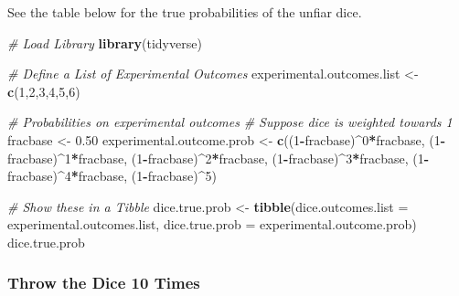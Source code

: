 \documentclass[
]{book}
\newenvironment{Shaded}{\begin{snugshade}}{\end{snugshade}}
\newcommand{\CommentTok}[1]{\textcolor[rgb]{0.56,0.35,0.01}{\textit{#1}}}
\newcommand{\DataTypeTok}[1]{\textcolor[rgb]{0.13,0.29,0.53}{#1}}
\newcommand{\DecValTok}[1]{\textcolor[rgb]{0.00,0.00,0.81}{#1}}
\newcommand{\FloatTok}[1]{\textcolor[rgb]{0.00,0.00,0.81}{#1}}
\newcommand{\KeywordTok}[1]{\textcolor[rgb]{0.13,0.29,0.53}{\textbf{#1}}}
\newcommand{\NormalTok}[1]{#1}
\newcommand{\OperatorTok}[1]{\textcolor[rgb]{0.81,0.36,0.00}{\textbf{#1}}}
\newcommand{\StringTok}[1]{\textcolor[rgb]{0.31,0.60,0.02}{#1}}
\begin{document}
See the table below for the true probabilities of the unfiar dice.

\begin{Shaded}
\begin{Highlighting}[]
\CommentTok{\# Load Library}
\KeywordTok{library}\NormalTok{(tidyverse)}

\CommentTok{\# Define a List of Experimental Outcomes}
\NormalTok{experimental.outcomes.list \textless{}{-}}\StringTok{ }\KeywordTok{c}\NormalTok{(}\DecValTok{1}\NormalTok{,}\DecValTok{2}\NormalTok{,}\DecValTok{3}\NormalTok{,}\DecValTok{4}\NormalTok{,}\DecValTok{5}\NormalTok{,}\DecValTok{6}\NormalTok{)}

\CommentTok{\# Probabilities on experimental outcomes}
\CommentTok{\# Suppose dice is weighted towards 1}
\NormalTok{fracbase \textless{}{-}}\StringTok{ }\FloatTok{0.50}
\NormalTok{experimental.outcome.prob \textless{}{-}}\StringTok{ }\KeywordTok{c}\NormalTok{((}\DecValTok{1}\OperatorTok{{-}}\NormalTok{fracbase)}\OperatorTok{\^{}}\DecValTok{0}\OperatorTok{*}\NormalTok{fracbase,}
\NormalTok{                               (}\DecValTok{1}\OperatorTok{{-}}\NormalTok{fracbase)}\OperatorTok{\^{}}\DecValTok{1}\OperatorTok{*}\NormalTok{fracbase,}
\NormalTok{                               (}\DecValTok{1}\OperatorTok{{-}}\NormalTok{fracbase)}\OperatorTok{\^{}}\DecValTok{2}\OperatorTok{*}\NormalTok{fracbase,}
\NormalTok{                               (}\DecValTok{1}\OperatorTok{{-}}\NormalTok{fracbase)}\OperatorTok{\^{}}\DecValTok{3}\OperatorTok{*}\NormalTok{fracbase,}
\NormalTok{                               (}\DecValTok{1}\OperatorTok{{-}}\NormalTok{fracbase)}\OperatorTok{\^{}}\DecValTok{4}\OperatorTok{*}\NormalTok{fracbase,}
\NormalTok{                               (}\DecValTok{1}\OperatorTok{{-}}\NormalTok{fracbase)}\OperatorTok{\^{}}\DecValTok{5}\NormalTok{)}

\CommentTok{\# Show these in a Tibble}
\NormalTok{dice.true.prob \textless{}{-}}\StringTok{ }\KeywordTok{tibble}\NormalTok{(}\DataTypeTok{dice.outcomes.list =}\NormalTok{ experimental.outcomes.list,}
                         \DataTypeTok{dice.true.prob =}\NormalTok{ experimental.outcome.prob)}
\NormalTok{dice.true.prob}
\end{Highlighting}
\end{Shaded}

\hypertarget{throw-the-dice-10-times}{%
\subsubsection{Throw the Dice 10 Times}\label{throw-the-dice-10-times}}
\end{document}
